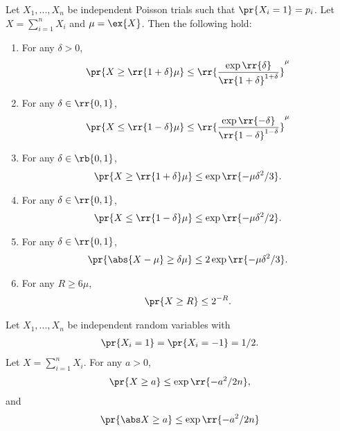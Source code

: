 \documentclass{article}
\begin{document}
\begin{theorem}
  Let $X_1,...,X_n$ be independent Poisson trials such that $\pr{X_i=1}=p_i$.
  Let $X=\sum_{i=1}^{n} X_i$ and $\mu=\ex{X}$. Then the following hold:
  \begin{enumerate}
    \item For any $\delta>0$, \begin{align*}
        \pr{X\geq \rr{1+\delta}\mu} \leq \rr{\frac{\exp\rr{\delta}}{\rr{1+\delta}^{1+\delta}}}^\mu
      \end{align*}
    \item For any $\delta\in\rr{0,1}$, \begin{align*}
        \pr{X\leq \rr{1-\delta}\mu} \leq \rr{\frac{\exp\rr{-\delta}}{\rr{1-\delta}^{1-\delta}}}^\mu
      \end{align*}
    \item For any $\delta\in\rb{0,1}$, \begin{align*}
        \pr{X\geq \rr{1+\delta}\mu}\leq \exp\rr{-\mu\delta^2/3}.
      \end{align*}
    \item For any $\delta\in\rr{0,1}$, \begin{align*}
        \pr{X\leq \rr{1-\delta}\mu}\leq \exp\rr{-\mu\delta^2/2}.
      \end{align*}
    \item For any $\delta\in\rr{0,1}$, \begin{align*}
        \pr{\abs{X-\mu}\geq \delta\mu}\leq 2\exp\rr{-\mu\delta^2/3}.
      \end{align*}
    \item For any $R\geq 6\mu$, \begin{align*}
        \pr{X\geq R}\leq 2^{-R}.
      \end{align*}
  \end{enumerate}
\end{theorem}

\begin{theorem}
  Let $X_1,...,X_n$ be independent random variables with
  \begin{align*}
    \pr{X_i=1}=\pr{X_i=-1}=1/2.
  \end{align*}
  Let $X=\sum_{i=1}^{n} X_i$. For any $a>0$,
  \begin{align*}
    \pr{X\geq a}\leq \exp\rr{-a^2/2n},
  \end{align*}
  and
  \begin{align*}
    \pr{\abs X\geq a}\leq \exp\rr{-a^2/2n}
  \end{align*}
\end{theorem}
\end{document}
